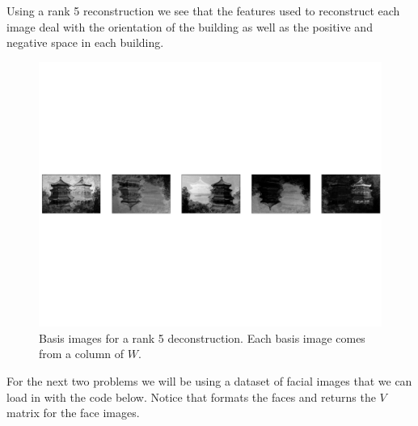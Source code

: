 Using a rank 5 reconstruction we see that the features used to reconstruct each image deal with the orientation of the building as well as the positive and negative space in each building.
\begin{figure}[H]
\centering
\includegraphics[width=\textwidth]{figures/building_basis_images.pdf}
\caption{Basis images for a rank 5 deconstruction.
	      Each basis image comes from a column of $W$.}
\label{fig:basis_building}
\end{figure}


For the next two problems we will be using a dataset of facial images that we can load in with the code below. Notice that  formats the faces and returns the $V$ matrix for the face images.

